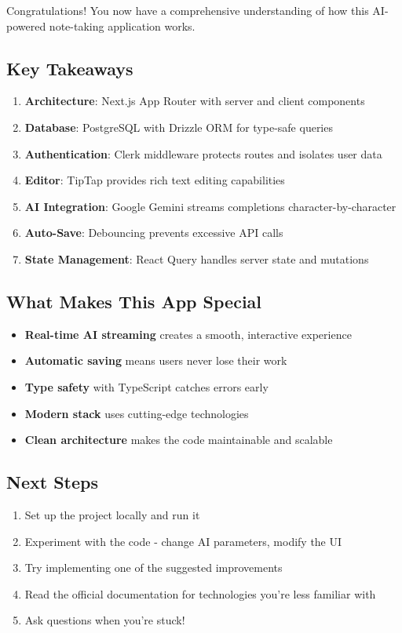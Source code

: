 \documentclass[11pt,a4paper]{article}
\begin{document}
Congratulations! You now have a comprehensive understanding of how this AI-powered note-taking application works.

\subsection{Key Takeaways}

\begin{enumerate}
    \item \textbf{Architecture}: Next.js App Router with server and client components
    \item \textbf{Database}: PostgreSQL with Drizzle ORM for type-safe queries
    \item \textbf{Authentication}: Clerk middleware protects routes and isolates user data
    \item \textbf{Editor}: TipTap provides rich text editing capabilities
    \item \textbf{AI Integration}: Google Gemini streams completions character-by-character
    \item \textbf{Auto-Save}: Debouncing prevents excessive API calls
    \item \textbf{State Management}: React Query handles server state and mutations
\end{enumerate}

\subsection{What Makes This App Special}

\begin{itemize}
    \item \textbf{Real-time AI streaming} creates a smooth, interactive experience
    \item \textbf{Automatic saving} means users never lose their work
    \item \textbf{Type safety} with TypeScript catches errors early
    \item \textbf{Modern stack} uses cutting-edge technologies
    \item \textbf{Clean architecture} makes the code maintainable and scalable
\end{itemize}

\subsection{Next Steps}

\begin{enumerate}
    \item Set up the project locally and run it
    \item Experiment with the code - change AI parameters, modify the UI
    \item Try implementing one of the suggested improvements
    \item Read the official documentation for technologies you're less familiar with
    \item Ask questions when you're stuck!
\end{enumerate}

\vspace{1cm}
\end{document}
